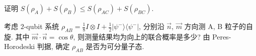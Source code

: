 \documentclass{assignment}
\begin{document}
\begin{probcontinued}{10}
    证明 $S(\rho_A)+S(\rho_B)\leq S(\rho_{AC})+S(\rho_{BC})$.
\end{probcontinued}
\begin{pf}
    
\end{pf}

\begin{probcontinued}{11}
    考虑 $2$-qubit 系统 $\rho_{AB}=\frac{1}{8}I\otimes I+\frac{1}{2}\lvert\psi^-\rangle\langle\psi^-\rvert$, 分别沿 $\vec{n}$, $\vec{m}$ 方向测 A, B 粒子的自旋. 其中 $\vec{m}\cdot\vec{n}=\cos\theta$, 则测量结果均为向上的联合概率是多少? 由 Peres-Horodeski 判据, 确定 $\rho_{AB}$ 是否为可分量子态.
\end{probcontinued}
\begin{sol}
    
\end{sol}
\end{document}
